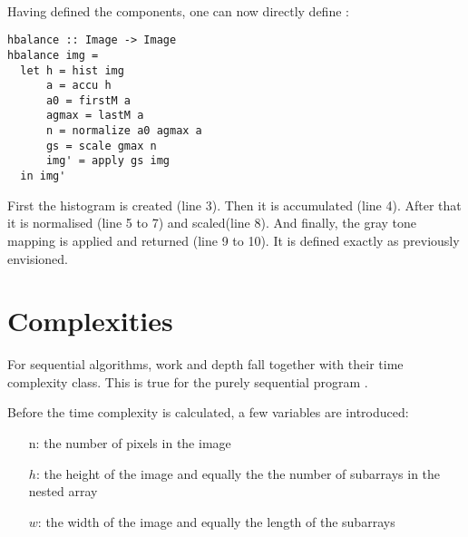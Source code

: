   \paragraph{\algo}
  Having defined the components, one can now directly define \seq:
  \begin{lstlisting}
hbalance :: Image -> Image
hbalance img =
  let h = hist img
      a = accu h
      a0 = firstM a
      agmax = lastM a
      n = normalize a0 agmax a
      gs = scale gmax n
      img' = apply gs img
  in img'
  \end{lstlisting}
  First the histogram is created (line 3). Then it is accumulated (line 4).
  After that it is normalised (line 5 to 7) and scaled(line 8).
  And finally, the gray tone mapping is applied and returned (line 9 to 10).
  It is defined exactly as previously envisioned.
  
\section{Complexities}
  For sequential algorithms, work and depth fall
  together with their time complexity class.
  This is true for the purely sequential
  program \seq.
  
  Before the time complexity is calculated, 
  a few variables are introduced:
  \begin{itemize}
    \item[n:] the number of pixels in the image
    \item[$h$:] the height of the image and equally the
              the number of subarrays in the nested array
    \item[$w$:] the width of the image and
              equally the length of the subarrays
  \end{itemize}
  
